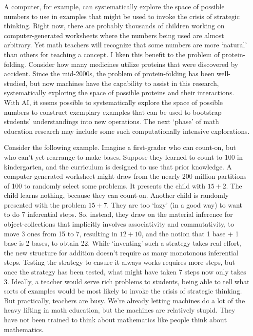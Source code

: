 \documentclass[12pt]{book}
\begin{document}
A computer, for example, can systematically explore the space of possible numbers to use in examples that might be used to invoke the crisis of strategic thinking. Right now, there are probably thousands of children working on computer-generated worksheets where the numbers being used are almost arbitrary. Yet math teachers will recognize that some numbers are more `natural' than others for teaching a concept. I liken this benefit to the problem of protein-folding. Consider how many medicines utilize proteins that were discovered by accident. Since the mid-2000s, the problem of protein-folding has been well-studied, but now machines have the capability to assist in this research, systematically exploring the space of possible proteins and their interactions. With AI, it seems possible to systematically explore the space of possible numbers to construct exemplary examples that can be used to bootstrap students' understandings into new operations. The next `phase' of math education research may include some such computationally intensive explorations.  

Consider the following example. Imagine a first-grader who can count-on, but who can't yet rearrange to make bases. Suppose they learned to count to 100 in kindergarten, and the curriculum is designed to use that prior knowledge. A computer-generated worksheet might draw from the nearly 200 million partitions of 100 to randomly select some problems. It presents the child with $15+2$. The child learns nothing, because they can count-on. Another child is randomly presented with the problem $15+7$. They are too `lazy' (in a good way) to want to do 7 inferential steps. So, instead, they draw on the material inference for object-collections that implicitly involves associativity and commutativity, to move 3 ones from 15 to 7, resulting in $12+10$, and the notion that 1 base + 1 base is 2 bases, to obtain 22. While `inventing' such a strategy takes real effort, the new structure for addition doesn't require as many monotonous inferential steps. Testing the strategy to ensure it always works requires more steps, but once the strategy has been tested, what might have taken 7 steps now only takes 3. Ideally, a teacher would serve rich problems to students, being able to tell what sorts of examples would be most likely to invoke the crisis of strategic thinking. But practically, teachers are busy. We're already letting machines do a lot of the heavy lifting in math education, but the machines are relatively stupid. They have not been trained to think about mathematics like people think about mathematics. 
\end{document}
